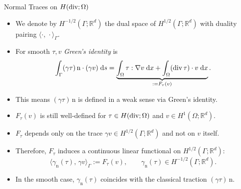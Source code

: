 \documentclass[10pt,aspectratio=169]{beamer}
\def\R{{\mathbb R}}
\def\d{{\mathrm{d}}}
\def\dx{{\d x}}
\def\ds{{\d s}}
\newcommand{\diver}{\operatornamewithlimits{div}}
\begin{document}
\begin{frame}{Normal Traces on $H(\diver;\Omega)$}
	\begin{itemize}
		\item We denote by $H^{-1/2}(\Gamma;\R^d)$ the dual space of $H^{1/2}(\Gamma;\R^d)$ with duality pairing $\langle\cdot,\,\cdot\rangle_\Gamma$.
		\item For smooth $\tau,v$ {\em Green's identity} is
		      \begin{equation*}
			      \int_\Gamma (\gamma\tau)\,\mathrm n \cdot (\gamma v)\;\ds = \underbrace{\int_\Omega \tau:\nabla v\;\dx+\int_\Omega (\diver\tau)\cdot v\;\dx}_{:= F_\tau(v)}.
		      \end{equation*}
		\item This means $(\gamma\tau)\,\mathrm{n}$ is defined in a weak sense via Green's identity.
		\item $F_\tau(v)$ is still well-defined for $\tau\in H(\diver;\Omega)$ and $v\in H^1(\Omega;\R^d)$.
		\item $F_\tau$ depends only on the trace $\gamma v\in H^{1/2}(\Gamma;\R^d)$ and not on $v$ itself.
		\item Therefore, $F_\tau$ induces a continuous linear functional on $H^{1/2}(\Gamma;\R^d)$:
		      \begin{equation*}
			      \langle \gamma_{\mathrm n}(\tau),\,\gamma v\rangle_\Gamma := F_\tau(v),
			      \qquad \gamma_{\mathrm n}(\tau)\in H^{-1/2}(\Gamma;\R^d).
		      \end{equation*}
		\item In the smooth case, $\gamma_{\mathrm n}(\tau)$ coincides with the classical traction $(\gamma \tau)\,\mathrm n$.
	\end{itemize}
\end{frame}
\end{document}
